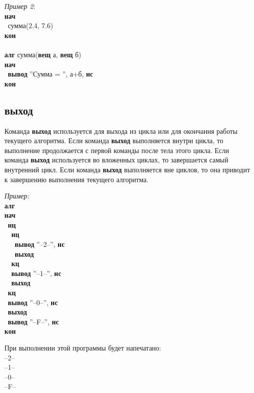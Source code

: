 \documentclass[12pt,a4paper]{article}
\newcommand{\otstup}{\textperiodcentered\ }
\begin{document}
\emph{Пример 2}:\\
{\sffamily
\textbf{нач}\\
\otstup сумма(2.4, 7.6)\\
\textbf{кон}\\
~\\
\textbf{алг} сумма(\textbf{вещ} а, \textbf{вещ} б)\\
\textbf{нач}\\
\otstup \textbf{вывод} ''Сумма = '', а+б, \textbf{нс}\\
\textbf{кон}
}

\subsection{выход}
\label{exit}

Команда \textbf{выход} используется для выхода из цикла или для окончания работы текущего алгоритма. Если команда \textbf{выход} выполняется внутри цикла, то выполнение продолжается с первой команды после тела этого цикла. Если команда \textbf{выход} используется во вложенных циклах, то завершается самый внутренний цикл. Если команда \textbf{выход} выполняется вне циклов, то она приводит к завершению выполнения текущего алгоритма.

\emph{Пример:}\\
{\sffamily
\textbf{алг}\\
\textbf{нач}\\
\otstup \textbf{нц}\\
\otstup \otstup \textbf{нц}\\
\otstup \otstup \otstup \textbf{вывод} ''--2--'', \textbf{нс}\\
\otstup \otstup \otstup \textbf{выход}\\
\otstup \otstup \textbf{кц}\\
\otstup \otstup \textbf{вывод} ''--1--'', \textbf{нс}\\
\otstup \otstup \textbf{выход}\\
\otstup \textbf{кц}\\
\otstup \textbf{вывод} ''--0--'', \textbf{нс}\\
\otstup \textbf{выход}\\
\otstup \textbf{вывод} ''--F--'', \textbf{нс}\\
\textbf{кон}
}

При выполнении этой программы будет напечатано:\\
{\sffamily
--2--\\
--1--\\
--0--\\
--F--
}
\end{document}
